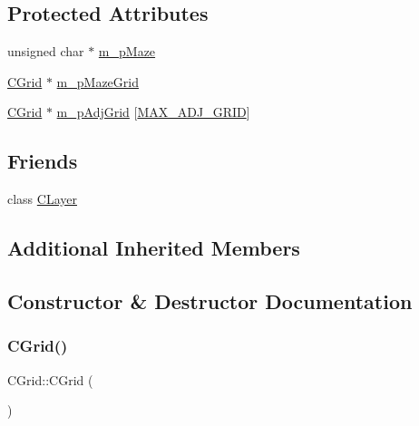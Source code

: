 \subsection*{Protected Attributes}
\begin{DoxyCompactItemize}
\item 
unsigned char $\ast$ \mbox{\hyperlink{classCGrid_afcbc0f78cba690a48e1db6e54365acd9}{m\+\_\+p\+Maze}}
\item 
\mbox{\hyperlink{classCGrid}{C\+Grid}} $\ast$ \mbox{\hyperlink{classCGrid_aa46a2d46372fef4d8ac13c61f575ea89}{m\+\_\+p\+Maze\+Grid}}
\item 
\mbox{\hyperlink{classCGrid}{C\+Grid}} $\ast$ \mbox{\hyperlink{classCGrid_a95af50152ecab2a3b8c1c58a4cd1f854}{m\+\_\+p\+Adj\+Grid}} \mbox{[}\mbox{\hyperlink{BoxRouter_8h_a128a23fb1a65ac37f6c65d9ce0e6beeb}{M\+A\+X\+\_\+\+A\+D\+J\+\_\+\+G\+R\+ID}}\mbox{]}
\end{DoxyCompactItemize}
\subsection*{Friends}
\begin{DoxyCompactItemize}
\item 
class \mbox{\hyperlink{classCGrid_a7cc4d31573956cc6792fa6757cc49219}{C\+Layer}}
\end{DoxyCompactItemize}
\subsection*{Additional Inherited Members}


\subsection{Constructor \& Destructor Documentation}
\mbox{\label{classCGrid_a061e223431ef4fb00b020539f34d1289}} 
\subsubsection{\texorpdfstring{CGrid()}{CGrid()}}
{\footnotesize\ttfamily C\+Grid\+::\+C\+Grid (\begin{DoxyParamCaption}{ }\end{DoxyParamCaption})}

\mbox{\label{classCGrid_a80640e70ebece5aab78c8445d7aef7a4}} 
